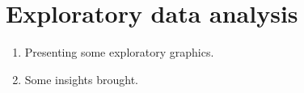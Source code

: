 \section{Exploratory data analysis}

\begin{enumerate}
    \item Presenting some exploratory graphics. 
    \item Some insights brought. 
\end{enumerate}
